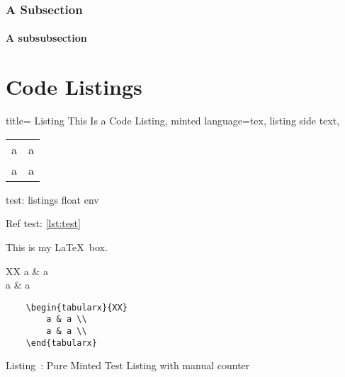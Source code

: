 \documentclass[a4paper,11pt,oneside,showtrims]{alpenthesis}
\begin{document}
\subsection{A Subsection}
\lipsum[1]

\subsubsection{A subsubsection}
\lipsum[2]
\chapter{Code Listings} %
\begin{listing}
    \tikzexternaldisable
    \begin{tcblisting}{%
            title={\label{lst:test} Listing \theATlisting This Is a Code Listing},
            minted language=tex,
            listing side text,
            }
        \begin{tabular}{ll}
            a & a \\
            a & a \\
        \end{tabular}
    \end{tcblisting}
    \tikzexternalenable
    \caption{test: listings float env}
\end{listing}

Ref test: \ref{lst:test}

\tikzexternaldisable
\begin{mybox}[
    title={test tcolorbox},
    minted language=tex,
    ]
    This is my
    \LaTeX\ box.
    \begin{tabularx}{XX}
        a & a \\
        a & a \\
    \end{tabularx}
\end{mybox}
\tikzexternalenable

\begin{verbatim}
    \begin{tabularx}{XX}
        a & a \\
        a & a \\
    \end{tabularx}
\end{verbatim}
\label{lst:minted}Listing~\theATlisting: Pure Minted
Test Listing with manual counter
\end{document}
